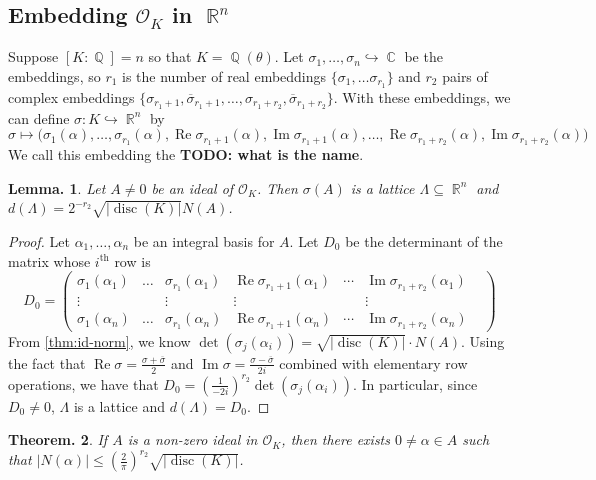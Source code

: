\documentclass[11pt, a4paper]{memoir}
\DeclareMathOperator{\Q}{{\mathbb{Q}}}
\DeclareMathOperator{\R}{{\mathbb{R}}}
\DeclareMathOperator{\C}{{\mathbb{C}}}
\newcommand{\hto}[0]{\ensuremath{\hookrightarrow}}
\newcommand{\ol}[1]{\ensuremath{\overline{#1}}}
\theoremstyle{change}
\newtheorem{theorem}{Theorem.}[section]
\newtheorem{lemma}[theorem]{Lemma.}
\theoremstyle{plain}
\theoremstyle{nonumberplain}
\newtheorem{proof}{Proof}
\DeclareMathOperator{\disc}{disc}
\renewcommand{\Re}{\ensuremath{\operatorname{Re}}}
\renewcommand{\Im}{\ensuremath{\operatorname{Im}}}
\newcommand{\mbf}[1]{{\boldmath\bfseries #1}}
\numberwithin{equation}{section}
\begin{document}
\subsection{Embedding \texorpdfstring{$\mathcal{O}_K$}{OK} in $\R^n$}
Suppose $[K:\Q]=n$ so that $K=\Q(\theta)$.
Let $\sigma_1,\ldots,\sigma_n\hto\C$ be the embeddings, so $r_1$ is the number of real embeddings $\{\sigma_1,\ldots\sigma_{r_1}\}$ and $r_2$ pairs of complex embeddings $\{\sigma_{r_1+1},\ol{\sigma}_{r_1+1},\ldots,\sigma_{r_1+r_2},\ol{\sigma}_{r_1+r_2}\}$.
With these embeddings, we can define $\sigma:K\hto\R^n$ by
\begin{equation*}
    \sigma\mapsto\bigl(\sigma_1(\alpha),\ldots,\sigma_{r_1}(\alpha),\Re\sigma_{r_1+1}(\alpha),\Im\sigma_{r_1+1}(\alpha),\ldots,\Re\sigma_{r_1+r_2}(\alpha),\Im\sigma_{r_1+r_2}(\alpha)\bigr)
\end{equation*}
We call this embedding the \mbf{TODO: what is the name}.
\begin{lemma}\label{lem:lat-sz}
    Let $A\neq 0$ be an ideal of $\mathcal{O}_K$.
    Then $\sigma(A)$ is a lattice $\Lambda\subseteq\R^n$ and $d(\Lambda)=2^{-r_2}\sqrt{|\disc(K)|}N(A)$.
\end{lemma}
\begin{proof}
    Let $\alpha_1,\ldots,\alpha_n$ be an integral basis for $A$.
    Let $D_0$ be the determinant of the matrix whose $i^{\text{th}}$ row is
    \begin{equation*}
        D_0=
        \begin{pmatrix}
            \sigma_1(\alpha_1)&\ldots&\sigma_{r_1}(\alpha_1)&\Re\sigma_{r_1+1}(\alpha_1)&\cdots&\Im\sigma_{r_1+r_2}(\alpha_1)\\
            \vdots&&\vdots&\vdots&&\vdots&\\
            \sigma_1(\alpha_n)&\ldots&\sigma_{r_1}(\alpha_n)&\Re\sigma_{r_1+1}(\alpha_n)&\cdots&\Im\sigma_{r_1+r_2}(\alpha_n)
        \end{pmatrix}
    \end{equation*}
    From \cref{thm:id-norm}, we know $\det(\sigma_j(\alpha_i))=\sqrt{|\disc(K)|}\cdot N(A)$.
    Using the fact that $\Re\sigma=\frac{\sigma+\ol{\sigma}}{2}$ and $\Im\sigma=\frac{\sigma-\ol{\sigma}}{2i}$ combined with elementary row operations, we have that $D_0=\left(\frac{1}{-2i}\right)^{r_2}\det(\sigma_j(\alpha_i))$.
    In particular, since $D_0\neq 0$, $\Lambda$ is a lattice and $d(\Lambda)=D_0$.
\end{proof}
\begin{theorem}
    If $A$ is a non-zero ideal in $\mathcal{O}_K$, then there exists $0\neq\alpha\in A$ such that $|N(\alpha)|\leq\left(\frac{2}{\pi}\right)^{r_2}\sqrt{|\disc(K)|}$.
\end{theorem}
\end{document}
